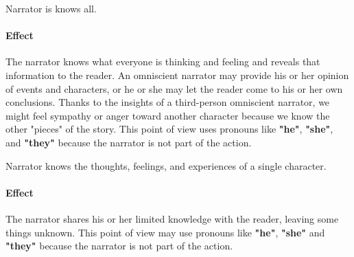 \begin{definition}[Omniscient]
    Narrator is knows all.
    
    \paragraph{Effect} The narrator knows what everyone is thinking and feeling
    and reveals that information to the reader. An omniscient narrator may
    provide his or her opinion of events and characters, or he or she may let
    the reader come to his or her own conclusions. Thanks to the insights of a
    third-person omniscient narrator, we might feel sympathy or anger toward
    another character because we know the other "pieces" of the story. This
    point of view uses pronouns like \textbf{"he"}, \textbf{"she"}, and
    \textbf{"they"} because the narrator is not part of the action.
\end{definition}

\begin{definition}
    Narrator knows the thoughts, feelings, and experiences of a single character.
    
    \paragraph{Effect} The narrator shares his or her limited knowledge with
    the reader, leaving some things unknown. This point of view may
    use pronouns like \textbf{"he"}, \textbf{"she"} and \textbf{"they"} because
    the narrator is not part of the action.
\end{definition}

\newpage
